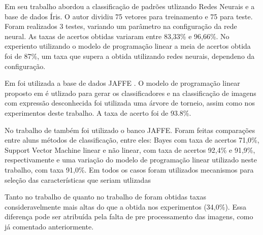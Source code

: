 Em seu trabalho  abordou a classificação de padrões utlizando Redes Neurais e a base de dados Íris. O autor dividiu 75 vetores para treinamento e 75 para teste. Foram realizados 3 testes, variando um parâmetro na configuração da rede neural. As taxas de acertos obtidas variaram entre 83,33\% e 96,66\%. No experiento utilizando o modelo de programação linear a meia de acertos obtida foi de 87\%, um taxa que supera a obtida utilizando redes neurais, dependeno da configuração.

Em  foi utilizada a base de dados JAFFE \cite{Jaffe}. O modelo de programação linear proposto em  é utlizado para gerar os classificadores e na classificação de imagens com expressão desconhecida foi utilizada uma árvore de torneio, assim como nos experimentos deste trabalho. A taxa de acerto foi de 93.8\%.

No trabalho de  também foi utilizado o banco JAFFE\cite{Jaffe}. Foram feitas comparações entre aluns métodos de classificação, entre eles: Bayes com taxa de acertos 71,0\%, Support Vector Machine linear e não linear, com taxa de acertos 92,4\% e 91,9\%, respectivamente e uma variação do modelo de programação linear utilizado neste trabalho, com taxa 91,0\%. Em todos os casos foram utilizados mecanismos para seleção das características que seriam utlizadas
 
Tanto no trabalho de  quanto no trabalho de  foram obtidas taxas consideravelmente mais altas do que a obtida nos experimentos (34,0\%). Essa diferença pode ser atribuída pela falta de pre processamento das imagens, como já comentado anteriormente.
